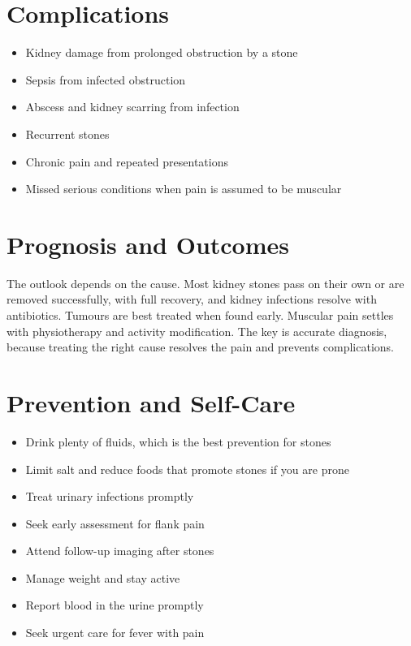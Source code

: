\section*{Complications}
\begin{itemize}
    \item Kidney damage from prolonged obstruction by a stone
    \item Sepsis from infected obstruction
    \item Abscess and kidney scarring from infection
    \item Recurrent stones
    \item Chronic pain and repeated presentations
    \item Missed serious conditions when pain is assumed to be muscular
\end{itemize}

\section*{Prognosis and Outcomes}
The outlook depends on the cause. Most kidney stones pass on their own or are removed successfully, with full recovery, and kidney infections resolve with antibiotics. Tumours are best treated when found early. Muscular pain settles with physiotherapy and activity modification. The key is accurate diagnosis, because treating the right cause resolves the pain and prevents complications.

\section*{Prevention and Self-Care}
\begin{itemize}
    \item Drink plenty of fluids, which is the best prevention for stones
    \item Limit salt and reduce foods that promote stones if you are prone
    \item Treat urinary infections promptly
    \item Seek early assessment for flank pain
    \item Attend follow-up imaging after stones
    \item Manage weight and stay active
    \item Report blood in the urine promptly
    \item Seek urgent care for fever with pain
\end{itemize}

